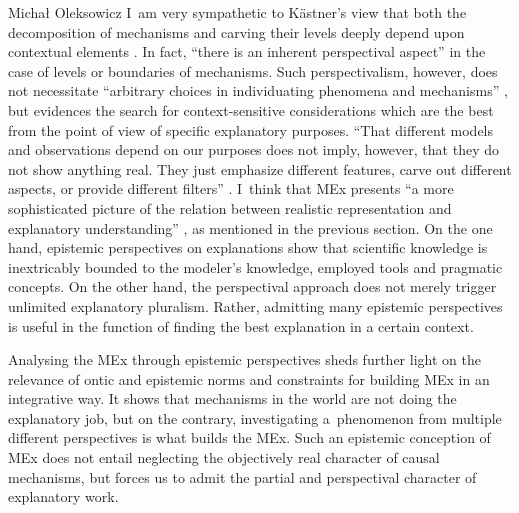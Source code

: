 \begin{artengenv}{Michał Oleksowicz}
I~am very sympathetic to Kästner's view that both the decomposition of mechanisms and carving their levels deeply depend upon contextual elements
\parencite[][pp.217–220]{woodward_comment_2008}. %
 In fact, ``there is an inherent perspectival aspect'' 
\parencite[][p.960]{darden_thinking_2008} %
 in the case of levels or boundaries of mechanisms. Such perspectivalism, however, does not necessitate ``arbitrary choices in individuating phenomena and mechanisms'' 
\parencite[][p.960]{darden_thinking_2008}, %
 but evidences the search for context-sensitive considerations which are the best from the point of view of specific explanatory purposes. ``That different models and observations depend on our purposes does not imply, however, that they do not show anything real. They just emphasize different features, carve out different aspects, or provide different filters'' 
\parencite[][p.76]{kastner_integrating_2018}. %
 I~think that MEx presents ``a more sophisticated picture of the relation between realistic representation and explanatory understanding'' 
\parencite[][p.3795]{de_regt_scientific_2015}, %
 as mentioned in the previous section. On the one hand, epistemic perspectives on explanations show that scientific knowledge is inextricably bounded to the modeler's knowledge, employed tools and pragmatic concepts. On the other hand, the perspectival approach does not merely trigger unlimited explanatory pluralism. Rather, admitting many epistemic perspectives is useful in the function of finding the best explanation in a certain context.

Analysing the MEx through epistemic perspectives sheds further light on the relevance of ontic and epistemic norms and constraints for building MEx in an integrative way. It shows that mechanisms in the world are not doing the explanatory job, but on the contrary, investigating a~phenomenon from multiple different perspectives is what builds the MEx. Such an epistemic conception of MEx does not entail neglecting the objectively real character of causal mechanisms, but forces us to admit the partial and perspectival character of explanatory work.


\end{artengenv}
